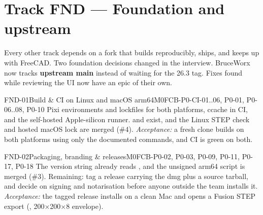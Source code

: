 \section{Track FND --- Foundation and upstream}\label{sec:fnd}

Every other track depends on a fork that builds reproducibly, ships, and keeps up with FreeCAD. Two
foundation decisions changed in the interview. BruceWorx now tracks \textbf{upstream main} instead of
waiting for the 26.3 tag. Fixes found while reviewing the UI now have an epic of their own.

\begin{epic}{FND-01}{Build \& CI on Linux and macOS arm64}{M0}{\stProg}{FCB-P0-CI-01..06, P0-01, P0-06..08, P0-10}
Pixi environments and lockfiles for both platforms, ccache in CI, and the self-hosted Apple-silicon runner.
 and  exist, and the Linux STEP check
and hosted macOS lock are merged (\#4).
\emph{Acceptance:} a fresh clone builds on both platforms using only the documented commands, and CI is green
on both.
\end{epic}

\begin{epic}{FND-02}{Packaging, branding \& releases}{M0}{\stProg}{FCB-P0-02, P0-03, P0-09, P0-11, P0-17, P0-18}
The version string already reads , and the unsigned arm64  script is merged
(\#3). Remaining: tag a release carrying the dmg plus a source tarball, and decide on signing and
notarisation before anyone outside the team installs it.
\emph{Acceptance:} the tagged release installs on a clean Mac and opens a Fusion STEP export
(, 200$\times$200$\times$8 envelope).
\end{epic}

